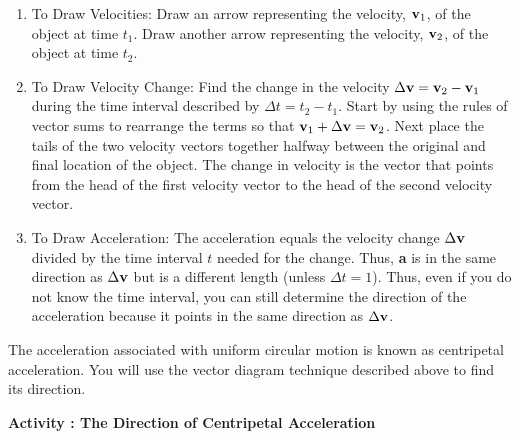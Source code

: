 \begin{enumerate}
\item To Draw Velocities: Draw an arrow representing the velocity, \( 
{\bf v}_{1} \), of
the object at time \( t_{1} \). Draw another arrow representing the velocity,
\( {\bf v}_{2} \), of the object at time \( t_{2} \). 
\item To Draw Velocity Change: Find the change in the velocity 
\( \Delta  {\bf v}
= {\bf v}_{2}  - {\bf v}_{1} \) during the time interval described
by \( \Delta  t = t_{2}  - t_{1} \). Start by using the rules of
vector sums to rearrange the terms so that \({\bf v}_{1}  +  \Delta  
{\bf v}
= {\bf v}_{2} \). Next place the tails of the two velocity vectors together
halfway between the original and final location of the object. The change in
velocity is the vector that points from the head of the first velocity vector
to the head of the second velocity vector. 
\item To Draw Acceleration: The acceleration equals the velocity change 
\( \Delta  {\bf v}\)
divided by the time interval $t$ needed for the change. Thus, \textbf{a} is in
the same direction as \( \Delta  {\bf v}\) but is a different length (unless
\( \Delta  t = 1\)). Thus, even if you do not know the time interval, you
can still determine the direction of the acceleration because it points in the
same direction as \( \Delta  {\bf v}\). 
\end{enumerate}
The acceleration associated with uniform circular motion is known as centripetal
acceleration. You will use the vector diagram technique described above to find
its direction. 

\textbf{Activity : The Direction of Centripetal Acceleration }

